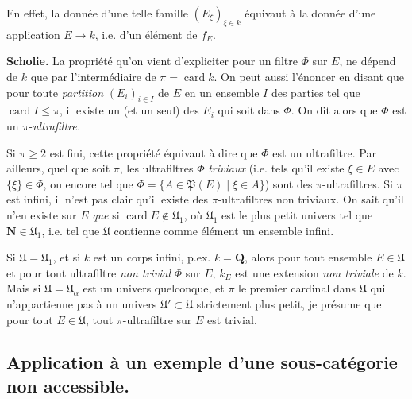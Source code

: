 \documentclass[11pt]{article}
\newcommand{\printedpage}[1]{\marginpar{\footnotesize p.~#1}}
\newcommand{\msp}[1]{\marginpar{\footnotesize [#1]}}
\begin{document}
\msp{page 10}
En effet, la donnée d'une telle famille $(E_\xi)_{\xi\in k}$ équivaut à la donnée d'une application $E\longrightarrow k$, i.e. d'un élément de $f_E$. %

\textbf{Scholie.} La propriété qu'on vient d'expliciter pour un filtre $\Phi$ sur $E$, ne dépend de $k$ que par l'intermédiaire de $\pi=\operatorname{card}k$. On peut aussi l'énoncer en disant que pour toute \textit{partition} $(E_i)_{i\in I}$ de $E$ en un ensemble $I$ des parties tel que $\operatorname{card}I\leqslant\pi$, il existe un (et un seul) des $E_i$ qui soit dans $\Phi$. On dit alors que $\Phi$ est un $\pi$-\textit{ultrafiltre.}

Si $\pi\geqslant 2$ est fini, cette propriété équivaut à dire que $\Phi$ est un ultrafiltre. Par ailleurs, quel que soit $\pi$, les ultrafiltres $\Phi$ \textit{triviaux} (i.e. tels qu'il existe $\xi\in E$ avec $\{\xi\}\in\Phi$, ou encore tel que $\Phi=\{A\in\mathfrak{P}(E)\mid\xi\in A\}$) sont des $\pi$-ultrafiltres. Si $\pi$ est infini, il n'est pas clair qu'il existe des $\pi$-ultrafiltres non triviaux. On sait qu'il n'en existe sur $E$ \textit{que} si $\operatorname{card}E\notin\mathfrak{U}_1$, où $\mathfrak{U}_1$ est le plus petit univers tel que $\mathbf{N}\in\mathfrak{U}_1$, i.e. tel
\msp{page 11}
que $\mathfrak{U}$ contienne comme élément un ensemble infini.

Si $\mathfrak{U}=\mathfrak{U}_1$, et si $k$ est un corps infini, p.ex. $k=\mathbf{Q}$, alors pour tout ensemble $E\in\mathfrak{U}$ et pour tout ultrafiltre \textit{non trivial} $\Phi$ sur $E$, $k_E$ est une extension \textit{non triviale} de $k$. Mais si $\mathfrak{U}=\mathfrak{U}_\alpha$ est un univers quelconque, et $\pi$ le premier cardinal dans $\mathfrak{U}$ qui n'appartienne pas à un univers $\mathfrak{U}'\subset\mathfrak{U}$ strictement plus petit, je présume que pour tout $E\in\mathfrak{U}$, tout $\pi$-ultrafiltre sur $E$ est trivial. %

\printedpage{196}

\subsection*{Application à un exemple d'une sous-catégorie non accessible.}
\end{document}
